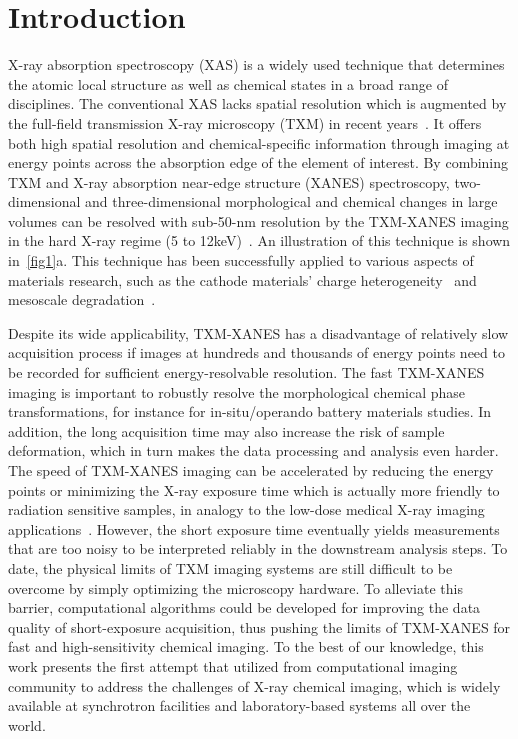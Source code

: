 \documentclass[10pt,twocolumn,letterpaper]{article}
\begin{document}
\section{Introduction}
\label{sec:intro}

X-ray absorption spectroscopy (XAS) is a widely used technique that determines the atomic local structure as well as chemical states in a broad range of disciplines. The conventional XAS lacks spatial resolution which is augmented by the full-field transmission X-ray microscopy (TXM) in recent years~\cite{meirer2011three,wang2014operando,pattammattel2020high}. It offers both high spatial resolution and chemical-specific information through imaging at energy points across the absorption edge of the element of interest. By combining TXM and X-ray absorption near-edge structure (XANES) spectroscopy, two-dimensional and three-dimensional morphological and chemical changes in large volumes can be resolved with sub-50-nm resolution by the TXM-XANES imaging in the hard X-ray regime (5 to 12keV)~\cite{nelson2011three}. An illustration of this technique is shown in~\cref{fig1}a. This technique has been successfully applied to various aspects of materials research, such as the cathode materials’ charge heterogeneity~\cite{wang2014operando,xu2017situ} and mesoscale degradation~\cite{qian2021understanding}.

Despite its wide applicability, TXM-XANES has a disadvantage of relatively slow acquisition process if images at hundreds and thousands of energy points need to be recorded for sufficient energy-resolvable resolution. The fast TXM-XANES imaging is important to robustly resolve the morphological chemical phase transformations, for instance for in-situ/operando battery materials studies. In addition, the long acquisition time may also increase the risk of sample deformation, which in turn makes the data processing and analysis even harder. The speed of TXM-XANES imaging can be accelerated by reducing the energy points or minimizing the X-ray exposure time which is actually more friendly to radiation sensitive samples, in analogy to the low-dose medical X-ray imaging applications~\cite{ravishankar2019image,wang2020deep}. However, the short exposure time eventually yields measurements that are too noisy to be interpreted reliably in the downstream analysis steps. To date, the physical limits of TXM imaging systems are still difficult to be overcome by simply optimizing the microscopy hardware. To alleviate this barrier, computational algorithms could be developed for improving the data quality of short-exposure acquisition, thus pushing the limits of TXM-XANES for fast and high-sensitivity chemical imaging. To the best of our knowledge, this work presents the first attempt that utilized from computational imaging community to address the challenges of X-ray chemical imaging, which is widely available at synchrotron facilities and laboratory-based systems all over the world. 
\end{document}
